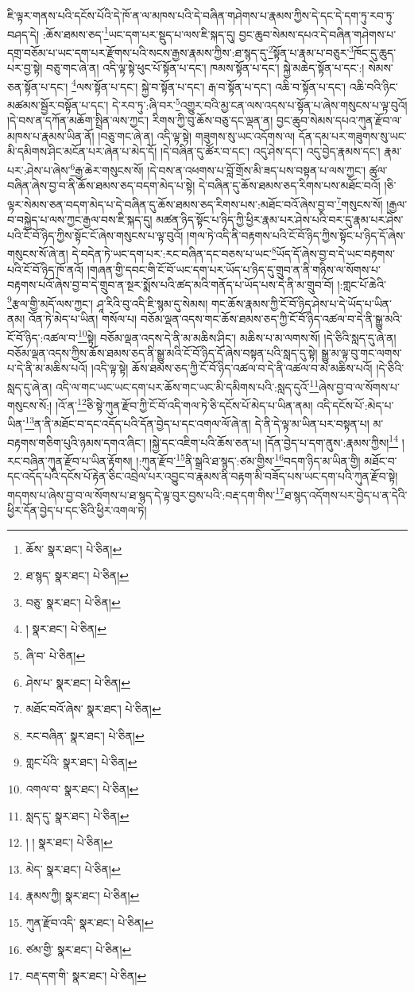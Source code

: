ཇི་ལྟར་གནས་པའི་དངོས་པོའི་དེ་ཁོ་ན་ལ་མཁས་པའི་དེ་བཞིན་གཤེགས་པ་རྣམས་ཀྱིས་དེ་དང་དེ་དག་ཏུ་རབ་ཏུ་བཤད་དེ། :ཆོས་ཐམས་ཅད་\footnote{ཆོས་  སྣར་ཐང་།  པེ་ཅིན། }ཡང་དག་པར་སྡུད་པ་ལས་ཇི་སྐད་དུ། བྱང་ཆུབ་སེམས་དཔའ་དེ་བཞིན་གཤེགས་པ་དགྲ་བཅོམ་པ་ཡང་དག་པར་རྫོགས་པའི་སངས་རྒྱས་རྣམས་ཀྱིས་:ཐ་སྙད་དུ་\footnote{ཐ་སྙད་  སྣར་ཐང་།  པེ་ཅིན། }སྟོན་པ་རྣམ་པ་བཅུར་\footnote{བཅུ་  སྣར་ཐང་།  པེ་ཅིན། }ཁོང་དུ་ཆུད་པར་བྱ་སྟེ། བཅུ་གང་ཞེ་ན། འདི་ལྟ་སྟེ་ཕུང་པོ་སྟོན་པ་དང་། ཁམས་སྟོན་པ་དང་། སྐྱེ་མཆེད་སྟོན་པ་དང་:། སེམས་ཅན་སྟོན་པ་དང་། \footnote{།    སྣར་ཐང་།  པེ་ཅིན། }ལས་སྟོན་པ་དང་། སྐྱེ་བ་སྟོན་པ་དང་། རྒ་བ་སྟོན་པ་དང་། འཆི་བ་སྟོན་པ་དང་། འཆི་བའི་ཉིང་མཚམས་སྦྱོར་བསྟོན་པ་དང་། དེ་རབ་ཏུ་:ཞི་བར་\footnote{ཞི་བ་  པེ་ཅིན། }འགྱུར་བའི་མྱ་ངན་ལས་འདས་པ་སྟོན་པ་ཞེས་གསུངས་པ་ལྟ་བུའོ། །དེ་བས་ན་དཀོན་མཆོག་སྤྲིན་ལས་ཀྱང་། རིགས་ཀྱི་བུ་ཆོས་བཅུ་དང་ལྡན་ན། བྱང་ཆུབ་སེམས་དཔའ་ཀུན་རྫོབ་ལ་མཁས་པ་རྣམས་ཡིན་ནོ། །བཅུ་གང་ཞེ་ན། འདི་ལྟ་སྟེ། གཟུགས་སུ་ཡང་འདོགས་ལ། དོན་དམ་པར་གཟུགས་སུ་ཡང་མི་དམིགས་ཤིང་མངོན་པར་ཞེན་པ་མེད་དོ། །དེ་བཞིན་དུ་ཚོར་བ་དང་། འདུ་ཤེས་དང་། འདུ་བྱེད་རྣམས་དང་། རྣམ་པར་:ཤེས་པ་ཞེས་\footnote{ཤེས་པ་  སྣར་ཐང་།  པེ་ཅིན། }རྒྱ་ཆེར་གསུངས་སོ། །དེ་བས་ན་འཕགས་པ་བློ་གྲོས་མི་ཟད་པས་བསྟན་པ་ལས་ཀྱང་། ཚུལ་བཞིན་ཞེས་བྱ་བ་ནི་ཆོས་ཐམས་ཅད་བདག་མེད་པ་སྟེ། དེ་བཞིན་དུ་ཆོས་ཐམས་ཅད་རིགས་པས་མཐོང་བའོ། །ཅི་ལྟར་སེམས་ཅན་བདག་མེད་པ་དེ་བཞིན་དུ་ཆོས་ཐམས་ཅད་རིགས་པས་:མཐོང་བའོ་ཞེས་བྱ་བ་\footnote{མཐོང་བའོ་ཞེས་  སྣར་ཐང་།  པེ་ཅིན། }གསུངས་སོ། །རྒྱལ་བ་བསྐྱེད་པ་ལས་ཀྱང་རྒྱལ་བས་ཇི་སྐད་དུ། མཚན་ཉིད་སྟོང་པ་ཉིད་ཀྱི་ཕྱིར་རྣམ་པར་ཤེས་པའི་བར་དུ་རྣམ་པར་ཤེས་པའི་ངོ་བོ་ཉིད་ཀྱིས་སྟོང་ངོ་ཞེས་གསུངས་པ་ལྟ་བུའོ། །གལ་ཏེ་འདི་ནི་བརྟགས་པའི་ངོ་བོ་ཉིད་ཀྱིས་སྟོང་པ་ཉིད་དོ་ཞེས་གསུངས་སོ་ཞེ་ན། དེ་བདེན་ཏེ་ཡང་དག་པར་:རང་བཞིན་དང་བཅས་པ་ཡང་\footnote{རང་བཞིན་  སྣར་ཐང་།  པེ་ཅིན། }ཡོད་དོ་ཞེས་བྱ་བ་དེ་ཡང་བརྟགས་པའི་ངོ་བོ་ཉིད་ཁོ་ནའོ། །གཞན་གྱི་དབང་གི་ངོ་བོ་ཡང་དག་པར་ཡོད་པ་ཉིད་དུ་གྲུབ་ན་ནི་གཉིས་ལ་སོགས་པ་བརྟགས་པའོ་ཞེས་བྱ་བ་དེ་གྲུབ་ན་སྔར་སྨོས་པའི་ཚད་མའི་གནོད་པ་ཡོད་པས་དེ་ནི་མ་གྲུབ་བོ། །:གླང་པོ་ཆེའི་\footnote{གླང་པོའི་  སྣར་ཐང་།  པེ་ཅིན། }རྩལ་གྱི་མདོ་ལས་ཀྱང་། ཤཱ་རིའི་བུ་འདི་ཇི་སྙམ་དུ་སེམས། གང་ཆོས་རྣམས་ཀྱི་ངོ་བོ་ཉིད་ཤེས་པ་དེ་ཡོད་པ་ཡིན་ནམ། འོན་ཏེ་མེད་པ་ཡིན། གསོལ་པ། བཅོམ་ལྡན་འདས་གང་ཆོས་ཐམས་ཅད་ཀྱི་ངོ་བོ་ཉིད་འཚལ་བ་དེ་ནི་སྒྱུ་མའི་ངོ་བོ་ཉིད་:འཚལ་བ་\footnote{འགལ་བ་  སྣར་ཐང་།  པེ་ཅིན། }སྟེ། བཅོམ་ལྡན་འདས་དེ་ནི་མ་མཆིས་ཤིང་། མཆིས་པ་མ་ལགས་སོ། །དེ་ཅིའི་སླད་དུ་ཞེ་ན། བཅོམ་ལྡན་འདས་ཀྱིས་ཆོས་ཐམས་ཅད་ནི་སྒྱུ་མའི་ངོ་བོ་ཉིད་དོ་ཞེས་བསྟན་པའི་སླད་དུ་སྟེ། སྒྱུ་མ་ལྟ་བུ་གང་ལགས་པ་དེ་ནི་མ་མཆིས་པའོ། །འདི་ལྟ་སྟེ། ཆོས་ཐམས་ཅད་ཀྱི་ངོ་བོ་ཉིད་འཚལ་བ་དེ་ནི་འཚལ་བ་མ་མཆིས་པའོ། །དེ་ཅིའི་སླད་དུ་ཞེ་ན། འདི་ལ་གང་ཡང་ཡང་དག་པར་ཆོས་གང་ཡང་མི་དམིགས་པའི་:སླད་དུའོ་\footnote{སླད་དུ་  སྣར་ཐང་།  པེ་ཅིན། }ཞེས་བྱ་བ་ལ་སོགས་པ་གསུངས་སོ:། །འོ་ན་\footnote{། །  སྣར་ཐང་།  པེ་ཅིན། }ཅི་སྟེ་ཀུན་རྫོབ་ཀྱི་ངོ་བོ་འདི་གལ་ཏེ་ཅི་དངོས་པོ་མེད་པ་ཡིན་ནམ། འདི་དངོས་པོ་:མེད་པ་ཡིན་\footnote{མེད་  སྣར་ཐང་།  པེ་ཅིན། }ན་ནི་མཐོང་བ་དང་འདོད་པའི་དོན་བྱེད་པ་དང་འགལ་ལོ་ཞེ་ན། དེ་ནི་དེ་ལྟ་མ་ཡིན་པར་བསྟན་པ། མ་བརྟགས་གཅིག་པུའི་ཉམས་དགའ་ཞིང་། །སྐྱེ་དང་འཇིག་པའི་ཆོས་ཅན་པ། །དོན་བྱེད་པ་དག་ནུས་:རྣམས་ཀྱིས།\footnote{རྣམས་ཀྱི།  སྣར་ཐང་།  པེ་ཅིན། } །རང་བཞིན་ཀུན་རྫོབ་པ་ཡིན་རྟོགས། །:ཀུན་རྫོབ་\footnote{ཀུན་རྫོབ་འདི་  སྣར་ཐང་།  པེ་ཅིན། }ནི་སྒྲའི་ཐ་སྙད་:ཙམ་གྱིས་\footnote{ཙམ་གྱི་  སྣར་ཐང་།  པེ་ཅིན། }བདག་ཉིད་མ་ཡིན་གྱི། མཐོང་བ་དང་འདོད་པའི་དངོས་པོ་རྟེན་ཅིང་འབྲེལ་པར་འབྱུང་བ་རྣམས་ནི་བརྟག་མི་བཟོད་པས་ཡང་དག་པའི་ཀུན་རྫོབ་སྟེ། གདགས་པ་ཞེས་བྱ་བ་ལ་སོགས་པ་ཐ་སྙད་དེ་ལྟ་བུར་བྱས་པའི་:བརྡ་དག་གིས་\footnote{བརྡ་དག་གི་  སྣར་ཐང་།  པེ་ཅིན། }ཐ་སྙད་འདོགས་པར་བྱེད་པ་ན་དེའི་ཕྱིར་དོན་བྱེད་པ་དང་ཅིའི་ཕྱིར་འགལ་ཏེ། 